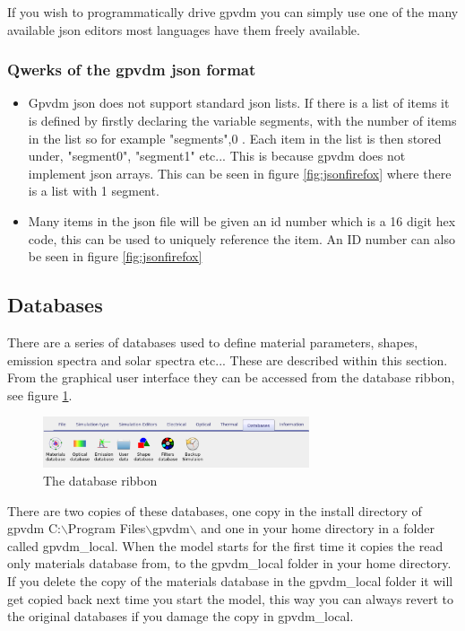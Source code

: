 If you wish to programmatically drive gpvdm you can simply use one of the many available json editors most languages have them freely available. 

\subsubsection{Qwerks of the gpvdm json format}
\begin{itemize}
  \item Gpvdm json does not support standard json lists.  If there is a list of items it is defined by firstly declaring the variable segments, with the number of items in the list so for example "segments",0 . Each item in the list is then stored under, "segment0", "segment1" etc... This is because gpvdm does not implement json arrays.  This can be seen in figure \ref{fig:jsonfirefox} where there is a list with 1 segment.
  \item Many items in the json file will be given an id number which is a 16 digit hex code, this can be used to uniquely reference the item. An ID number can also be seen in figure \ref{fig:jsonfirefox}
\end{itemize}



\subsection{Databases}
There are a series of databases used to define material parameters, shapes, emission spectra and solar spectra etc...  These are described within this section.  From the graphical user interface they can be accessed from the database ribbon, see figure \ref{fig:database}.

\begin{figure}[H]
\centering
\includegraphics[width=0.7\textwidth]{./images/database_ribbon.png}
\caption{The database ribbon}
\label{fig:database}
\end{figure}

There are two copies of these databases, one copy in the install directory of gpvdm  C:$\backslash$Program Files$\backslash$gpvdm$\backslash$ and one in your home directory in a folder called gpvdm\_local.   When the model starts for the first time it copies the read only materials database from, to the gpvdm\_local folder in your home directory.  If you delete the copy of the materials database in the gpvdm\_local folder it will get copied back next time you start the model, this way you can always revert to the original databases if you damage the copy in gpvdm\_local.

